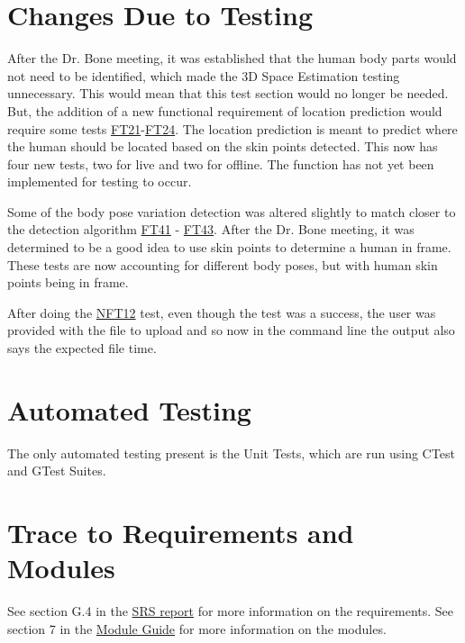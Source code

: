 \documentclass[12pt, titlepage]{article}
\begin{document}
\begin{table}[H]
{\begin{tabular}{|p{1.5cm}|p{2.5cm}|p{3cm}|p{4cm}|p{4cm}|p{1.8cm}|}
      \hline
  \end{tabular}
  }
\end{table}



\section{Changes Due to Testing}

After the Dr. Bone meeting, it was established that the human body parts would not need to be identified, which made the 3D Space Estimation testing unnecessary. This would mean that this test section would no longer be needed. But, the addition of a new functional requirement of location prediction would require some tests \hyperref[FT21]{FT21}-\hyperref[FT24]{FT24}. The location prediction is meant to predict where the human should be located based on the skin points detected. This now has four new tests, two for live and two for offline. The function has not yet been implemented for testing to occur.

Some of the body pose variation detection was altered slightly to match closer to the detection algorithm \hyperref[FT41]{FT41} - \hyperref[FT43]{FT43}. After the Dr. Bone meeting, it was determined to be a good idea to use skin points to determine a human in frame. These tests are now accounting for different body poses, but with human skin points being in frame.

After doing the \hyperref[NFT12]{NFT12}  test, even though the test was a success, the user was provided with the file to upload and so now in the command line the output also says the expected file time.


\section{Automated Testing}

The only automated testing present is the Unit Tests, which are run using CTest and GTest Suites.
		
\section{Trace to Requirements and Modules}		
See section G.4 in the \href{https://github.com/takhtart/PCD/blob/main/docs/SRS/SRS.pdf}{SRS report} for more information on the requirements. See section 7 in the \href{https://github.com/takhtart/PCD/blob/main/docs/Design/SoftArchitecture/MG.pdf}{Module Guide} for more information on the modules.
\end{document}

